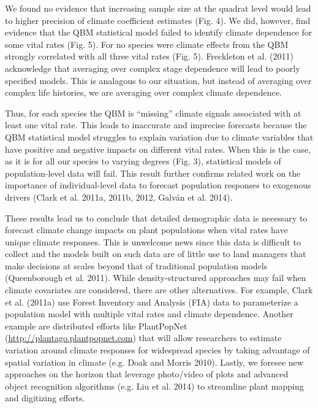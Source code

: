 \documentclass[12pt,]{article}
\begin{document}
We found no evidence that increasing sample size at the quadrat level
would lead to higher precision of climate coefficient estimates (Fig.
4). We did, however, find evidence that the QBM statistical model failed
to identify climate dependence for some vital rates (Fig. 5). For no
species were climate effects from the QBM strongly correlated with all
three vital rates (Fig. 5). Freckleton et al. (2011) acknowledge that
averaging over complex stage dependence will lead to poorly specified
models. This is analagous to our situation, but instead of averaging
over complex life histories, we are averaging over complex climate
dependence.

Thus, for each species the QBM is ``missing'' climate signals associated
with at least one vital rate. This leads to inaccurate and imprecise
forecasts because the QBM statistical model struggles to explain
variation due to climate variables that have positive and negative
impacts on different vital rates. When this is the case, as it is for
all our species to varying degrees (Fig. 3), statistical models of
population-level data will fail. This result further confirms related
work on the importance of individual-level data to forecast population
responses to exogenous drivers (Clark et al. 2011a, 2011b, 2012, Galván
et al. 2014).

These results lead us to conclude that detailed demographic data is
necessary to forecast climate change impacts on plant populations when
vital rates have unique climate responses. This is unwelcome news since
this data is difficult to collect and the models built on such data are
of little use to land managers that make decisions at scales beyond that
of traditional population models (Queenborough et al. 2011). While
density-structured approaches may fail when climate covariates are
considered, there are other alternatives. For example, Clark et al.
(2011a) use Forest Inventory and Analysis (FIA) data to parameterize a
population model with multiple vital rates and climate dependence.
Another example are distributed efforts like PlantPopNet
(\url{http://plantago.plantpopnet.com}) that will allow researchers to
estimate variation around climate responses for widespread species by
taking advantage of spatial variation in climate (e.g. Doak and Morris
2010). Lastly, we foresee new approaches on the horizon that leverage
photo/video of plots and advanced object recognition algorithms (e.g.
Liu et al. 2014) to streamline plant mapping and digitizing efforts.
\end{document}
